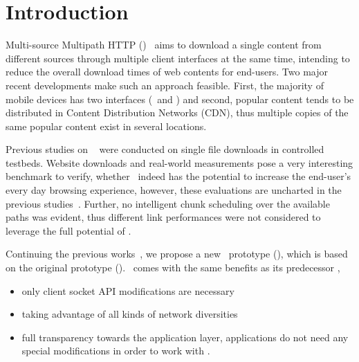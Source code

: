 \chapter{Introduction} %
\label{ch:introduction}






Multi-source Multipath HTTP (\mhttp)~\cite{JKIM14-TUND}\cite{KIMSIG} aims to download a single content from different sources through multiple client interfaces at the same time, intending to reduce the overall download times of web contents for end-users. 
Two major recent developments make such an approach feasible. 
First, the majority of mobile devices has two interfaces (\ie \wifi~and \lte) and 
second, popular content tends to be distributed in Content Distribution Networks (CDN), thus multiple copies of the same popular content exist in several locations. 

Previous studies on \mhttp~\cite{JKIM14-TUND}\cite{KIMSIG} were conducted on single file downloads in controlled testbeds. 
Website downloads and real-world measurements pose a very interesting benchmark to verify, whether \mhttp~indeed has the potential to increase the end-user's every day browsing experience, however, these evaluations are uncharted in the previous studies~\cite{JKIM14-TUND}\cite{KIMSIG}. 
Further, no intelligent chunk scheduling over the available paths was evident, thus different link performances were not considered to leverage the full potential of \mhttp. 

Continuing the previous works~\cite{JKIM14-TUND}\cite{KIMSIG}, we propose a new \mhttp~prototype (\protonew), which is based on the original prototype (\ie \protoold). 
\protonew~comes with the same benefits as its predecessor \protoold, \eg

\begin{itemize}
\item only client socket API modifications are necessary
\item taking advantage of all kinds of network diversities
\item full transparency towards the application layer, \ie applications do not need any special modifications in order to work with \mhttp.
\end{itemize}


